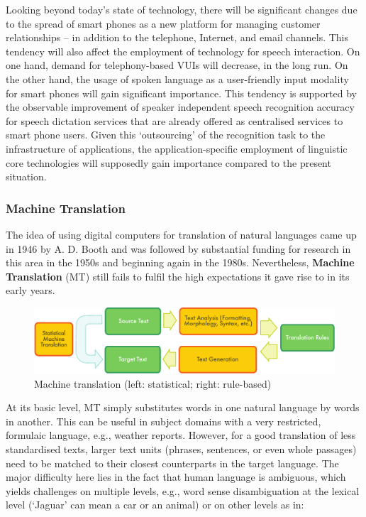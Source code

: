 \begin{multicols}{2}
Looking beyond today’s state of technology, there will be significant changes due to the spread of smart phones as a new platform for managing customer relationships – in addition to the telephone, Internet, and email channels. This tendency will also affect the employment of technology for speech interaction. On one hand, demand for telephony-based VUIs will decrease, in the long run. On the other hand, the usage of spoken language as a user-friendly input modality for smart phones will gain significant importance. This tendency is supported by the observable improvement of speaker independent speech recognition accuracy for speech dictation services that are already offered as centralised services to smart phone users. Given this ‘outsourcing’ of the recognition task to the infrastructure of applications, the application-specific employment of linguistic core technologies will supposedly gain importance compared to the present situation. 

\subsubsection{Machine Translation}
    The idea of using digital computers for translation of natural languages came up in 1946 by A. D. Booth and was followed by substantial funding for research in this area in the 1950s and beginning again in the 1980s. Nevertheless, \textbf{Machine Translation} (MT) still fails to fulfil the high expectations it gave rise to in its early years. 
    

\begin{figure}[htb]
  \center
  \includegraphics[width=\textwidth]{../_media/english/machine_translation}
  \caption{Machine translation (left: statistical; right: rule-based)}
  \label{fig:mtarch_en}
\end{figure}

At its basic level, MT simply substitutes words in one natural language by words in another. This can be useful in subject domains with a very restricted, formulaic language, e.g., weather reports. However, for a good translation of less standardised texts, larger text units (phrases, sentences, or even whole passages) need to be matched to their closest counterparts in the target language. The major difficulty here lies in the fact that human language is ambiguous, which yields challenges on multiple levels, e.g., 
word sense disambiguation at the lexical level (‘Jaguar’ can mean a car or an animal) or on other levels as in:


\end{multicols}
